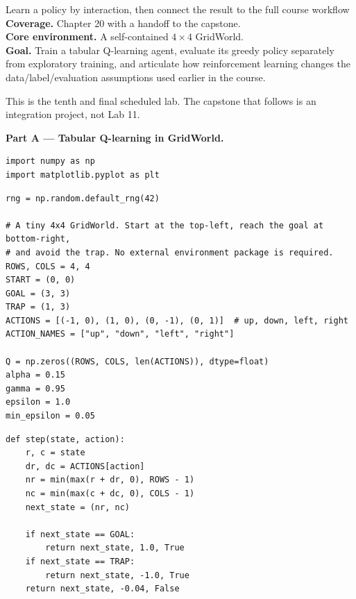 
\begin{labproject}{Learn a policy by interaction, then connect the result to the full course workflow}
\textbf{Coverage.} Chapter 20 with a handoff to the capstone.\\
\textbf{Core environment.} A self-contained $4\times4$ GridWorld.\\
\textbf{Goal.} Train a tabular Q-learning agent, evaluate its greedy policy separately from exploratory training, and articulate how reinforcement learning changes the data/label/evaluation assumptions used earlier in the course.

\begin{labmode}
This is the tenth and final scheduled lab. The capstone that follows is an integration project, not Lab 11.
\end{labmode}

\medskip\noindent\textbf{Part A --- Tabular Q-learning in GridWorld.}\par
\begin{lstlisting}[style=mlpython]
import numpy as np
import matplotlib.pyplot as plt
\end{lstlisting}

\begin{lstlisting}[style=mlpython]
rng = np.random.default_rng(42)

# A tiny 4x4 GridWorld. Start at the top-left, reach the goal at bottom-right,
# and avoid the trap. No external environment package is required.
ROWS, COLS = 4, 4
START = (0, 0)
GOAL = (3, 3)
TRAP = (1, 3)
ACTIONS = [(-1, 0), (1, 0), (0, -1), (0, 1)]  # up, down, left, right
ACTION_NAMES = ["up", "down", "left", "right"]

Q = np.zeros((ROWS, COLS, len(ACTIONS)), dtype=float)
alpha = 0.15
gamma = 0.95
epsilon = 1.0
min_epsilon = 0.05
\end{lstlisting}

\begin{lstlisting}[style=mlpython]
def step(state, action):
    r, c = state
    dr, dc = ACTIONS[action]
    nr = min(max(r + dr, 0), ROWS - 1)
    nc = min(max(c + dc, 0), COLS - 1)
    next_state = (nr, nc)

    if next_state == GOAL:
        return next_state, 1.0, True
    if next_state == TRAP:
        return next_state, -1.0, True
    return next_state, -0.04, False
\end{lstlisting}


\end{labproject}
